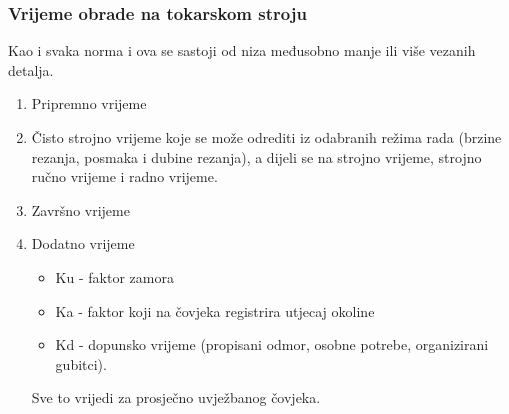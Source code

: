 \documentclass[a4paper,12pt]{article}
\numberwithin{figure}{section}
\begin{document}
\subsubsection{Vrijeme obrade na tokarskom stroju}
Kao i svaka norma i ova se sastoji od niza međusobno manje ili više vezanih detalja.
\begin{enumerate}
\item Pripremno vrijeme
\item Čisto strojno vrijeme koje se može odrediti iz odabranih režima rada (brzine rezanja, posmaka i dubine rezanja), a dijeli se na strojno vrijeme, strojno ručno vrijeme i radno vrijeme.
\item Završno vrijeme
\item Dodatno vrijeme
\begin{itemize}
\item Ku - faktor zamora
\item Ka - faktor koji na čovjeka registrira utjecaj okoline
\item Kd - dopunsko vrijeme (propisani odmor, osobne potrebe, organizirani gubitci).
\end{itemize}
Sve to vrijedi za prosječno uvježbanog čovjeka.
\end{enumerate}
\end{document}
